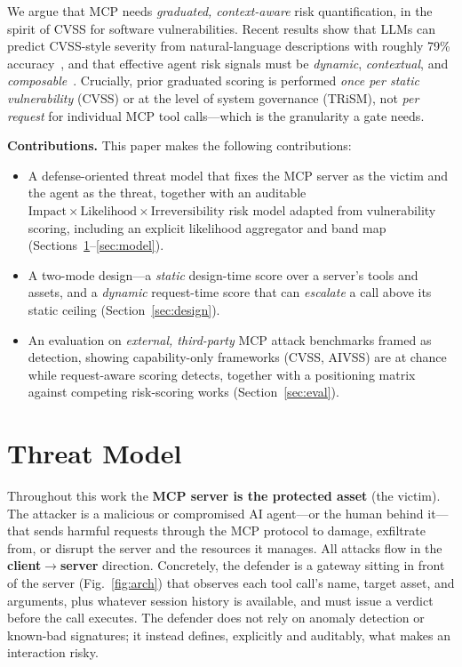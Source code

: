 \documentclass[conference]{IEEEtran}
\begin{document}
We argue that MCP needs \emph{graduated, context-aware} risk quantification, in
the spirit of CVSS for software vulnerabilities. Recent results show that LLMs can
predict CVSS-style severity from natural-language descriptions with roughly 79\%
accuracy~\cite{jafarikhah2026description_to_score}, and that effective agent risk
signals must be \emph{dynamic}, \emph{contextual}, and
\emph{composable}~\cite{raza2025trism}. Crucially, prior graduated scoring is
performed \emph{once per static vulnerability} (CVSS) or at the level of system
governance (TRiSM), not \emph{per request} for individual MCP tool calls---which
is the granularity a gate needs.

\noindent\textbf{Contributions.} This paper makes the following contributions:
\begin{itemize}
  \item A defense-oriented threat model that fixes the MCP server as the victim
        and the agent as the threat, together with an auditable
        $\text{Impact}\times\text{Likelihood}\times\text{Irreversibility}$ risk
        model adapted from vulnerability scoring, including an explicit likelihood
        aggregator and band map (Sections~\ref{sec:threat}--\ref{sec:model}).
  \item A two-mode design---a \emph{static} design-time score over a server's
        tools and assets, and a \emph{dynamic} request-time score that can
        \emph{escalate} a call above its static ceiling (Section~\ref{sec:design}).
  \item An evaluation on \emph{external, third-party} MCP attack benchmarks framed
        as detection, showing capability-only frameworks (CVSS, AIVSS) are at chance
        while request-aware scoring detects, together with a positioning matrix
        against competing risk-scoring works (Section~\ref{sec:eval}).
\end{itemize}

\section{Threat Model}
\label{sec:threat}

Throughout this work the \textbf{MCP server is the protected asset} (the victim).
The attacker is a malicious or compromised AI agent---or the human behind it---
that sends harmful requests through the MCP protocol to damage, exfiltrate from,
or disrupt the server and the resources it manages. All attacks flow in the
\textbf{client$\rightarrow$server} direction. Concretely, the defender is a
gateway sitting in front of the server (Fig.~\ref{fig:arch}) that observes each
tool call's name, target asset, and arguments, plus whatever session history is
available, and must issue a verdict before the call executes. The defender does
not rely on anomaly detection or known-bad signatures; it instead defines,
explicitly and auditably, what makes an interaction risky.
\end{document}
